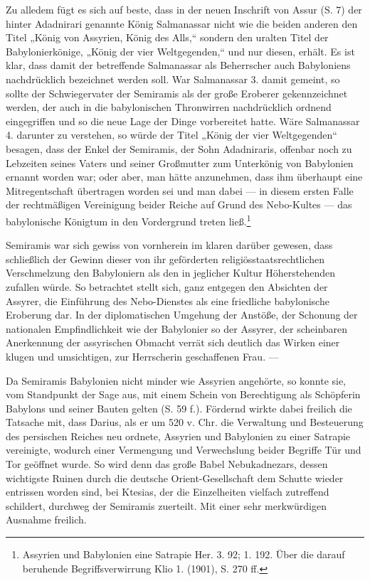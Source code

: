 \documentclass[a4paper, 11pt, oneside, polutonikogreek, german]{article}
\begin{document}
Zu alledem fügt es sich auf beste, dass in der neuen Inschrift von Assur (S. 7) der hinter Adadnirari genannte König Salmanassar nicht wie die beiden anderen den Titel „König von Assyrien, König des Alls,“ sondern den uralten Titel der Babylonierkönige, „König der vier Weltgegenden,“ und nur diesen, erhält. Es ist klar, dass damit der betreffende Salmanassar als Beherrscher auch Babyloniens nachdrücklich bezeichnet werden soll. War Salmanassar 3. damit gemeint, so sollte der Schwiegervater der Semiramis als der große Eroberer gekennzeichnet werden, der auch in die babylonischen Thronwirren nachdrücklich ordnend eingegriffen und so die neue Lage der Dinge vorbereitet hatte. Wäre Salmanassar 4. darunter zu verstehen, so würde der Titel „König der vier Weltgegenden“ besagen, dass der Enkel der Semiramis, der Sohn Adadniraris, offenbar noch zu Lebzeiten seines Vaters und seiner Großmutter zum Unterkönig von Babylonien ernannt worden war; oder aber, man hätte anzunehmen, dass ihm überhaupt eine Mitregentschaft übertragen worden sei und man dabei --- in diesem ersten Falle der rechtmäßigen Vereinigung beider Reiche auf Grund des Nebo-Kultes --- das babylonische Königtum in den Vordergrund treten ließ.\footnote{Assyrien und Babylonien eine Satrapie Her. 3. 92; 1. 192. Über die darauf beruhende Begriffsverwirrung Klio 1. (1901), S. 270 ff.}

Semiramis war sich gewiss von vornherein im klaren darüber gewesen, dass schließlich der Gewinn dieser von ihr geförderten religiösstaatsrechtlichen Verschmelzung den Babyloniern als den in jeglicher Kultur Höherstehenden zufallen würde. So betrachtet stellt sich, ganz entgegen den Absichten der Assyrer, die Einführung des Nebo-Dienstes als eine friedliche babylonische Eroberung dar. In der diplomatischen Umgehung der Anstöße, der Schonung der nationalen Empfindlichkeit wie der Babylonier so der Assyrer, der scheinbaren Anerkennung der assyrischen Obmacht verrät sich deutlich das Wirken einer klugen und umsichtigen, zur Herrscherin geschaffenen Frau. ---

Da Semiramis Babylonien nicht minder wie Assyrien angehörte, so konnte sie, vom Standpunkt der Sage aus, mit einem Schein von Berechtigung als Schöpferin Babylons und seiner Bauten gelten (S. 59 f.). Fördernd wirkte dabei freilich die Tatsache mit, dass Darius, als er um 520 v. Chr. die Verwaltung und Besteuerung des persischen Reiches neu ordnete, Assyrien und Babylonien zu einer Satrapie vereinigte, wodurch einer Vermengung und Verwechslung beider Begriffe Tür und Tor geöffnet wurde. So wird denn das große Babel Nebukadnezars, dessen wichtigste Ruinen durch die deutsche Orient-Gesellschaft dem Schutte wieder entrissen worden sind, bei Ktesias, der die Einzelheiten vielfach zutreffend schildert, durchweg der Semiramis zuerteilt. Mit einer sehr merkwürdigen Ausnahme freilich.
\end{document}
